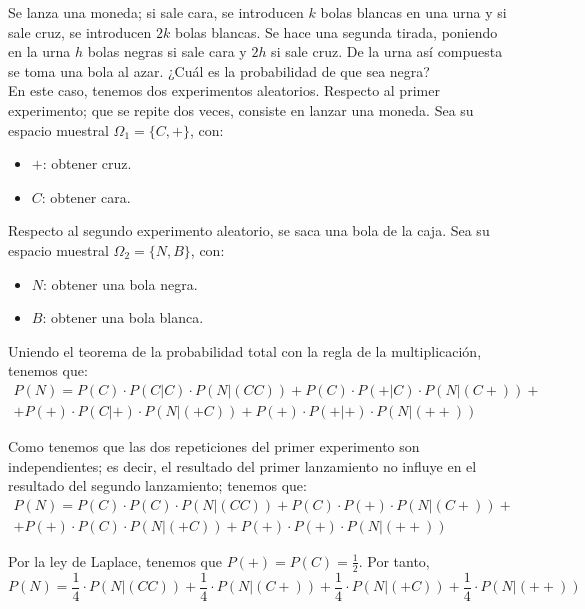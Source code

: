\begin{ejercicio} \label{ej:4.Ejercicio12}
    Se lanza una moneda; si sale cara, se introducen $k$ bolas blancas en una urna y si sale cruz, se introducen $2k$ bolas blancas. Se hace una segunda tirada, poniendo en la urna $h$ bolas negras si sale cara y $2h$ si sale cruz. De la urna así compuesta se toma una bola al azar. ¿Cuál es la probabilidad de que sea negra?\\

    En este caso, tenemos dos experimentos aleatorios. Respecto al primer experimento; que se repite dos veces, consiste en lanzar una moneda. Sea su espacio muestral $\Omega_1 = \{C,+\}$, con:
    \begin{itemize}
        \item $+$: obtener cruz.
        \item $C$: obtener cara.
    \end{itemize}

    Respecto al segundo experimento aleatorio, se saca una bola de la caja. Sea su espacio muestral $\Omega_2 = \{N, B\}$, con:
    \begin{itemize}
        \item $N$: obtener una bola negra.
        \item $B$: obtener una bola blanca.
    \end{itemize}

    Uniendo el teorema de la probabilidad total con la regla de la multiplicación, tenemos que:
    \begin{multline*}
        P(N) = P(C)\cdot P(C|C) \cdot P(N|(CC))
        + P(C)\cdot P(+|C) \cdot P(N|(C+))
        +\\+ P(+)\cdot P(C|+) \cdot P(N|(+C))
        + P(+)\cdot P(+|+) \cdot P(N|(++))
    \end{multline*}

    Como tenemos que las dos repeticiones del primer experimento son independientes; es decir, el resultado del primer lanzamiento no influye en el resultado del segundo lanzamiento; tenemos que:
    \begin{multline*}
        P(N) = P(C)\cdot P(C) \cdot P(N|(CC))
        + P(C)\cdot P(+) \cdot P(N|(C+))
        +\\+ P(+)\cdot P(C) \cdot P(N|(+C))
        + P(+)\cdot P(+) \cdot P(N|(++))
    \end{multline*}

    Por la ley de Laplace, tenemos que $P(+)=P(C)=\frac{1}{2}$. Por tanto,
    \begin{equation*}
        P(N) = \frac{1}{4}\cdot P(N|(CC))
        + \frac{1}{4}\cdot  P(N|(C+))
        + \frac{1}{4}\cdot  P(N|(+C))
        + \frac{1}{4}\cdot  P(N|(++))
    \end{equation*}


\end{ejercicio}
